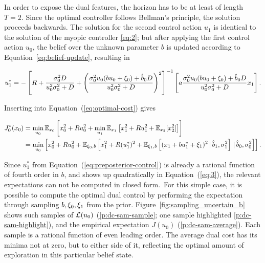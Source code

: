 In order to expose the dual features, the horizon has to be at least of length
$T=2$. Since the optimal controller follows Bellman's principle, the solution
proceeds backwards. The solution for the second control action $u_1$ is
identical to the solution of the myopic controller \eqref{eq:2}; but after
applying the first control action $u_0$, the belief over the unknown parameter
$b$ is updated according to Equation~\eqref{eq:belief-update}, resulting in
\begin{fullwidth}\vspace{-\baselineskip}
\begin{equation}
  \label{eq:preposterior-control}
  u_{1}^* = -\left[\CC +
    \frac{\sigma_0 ^2 \DC}{u_0 ^2\sigma_0 ^2
      +  \DC} + \left(\frac{\sigma_0 ^2 u_0 (b u_0 + \dist_0) + \hat b_0
        \DC}{u_0 ^2 \sigma_0 ^2 + \DC}\right)^2\right]^{-1}
    \left[a \frac{\sigma_0 ^2 u_0 (b u_0 +
      \dist_0) + \hat b_0 \DC}{u_0 ^2 \sigma_0 ^2 + \DC} x_{1}\right].
\end{equation}
\end{fullwidth}

Inserting into Equation~(\ref{eq:optimal-cost}) gives
\begin{fullwidth}\vspace{-\baselineskip}
\begin{equation}
  \label{eq:3}
  \begin{split}
    J_0^*(x_0) &= \min_{u_0} \Exp_{x_0}\left[x_0^2 + \CC
      u_0^2 + \min_{u_1} \Exp_{x_1} \left[ x_1^2 + \CC u_1 ^2
        +\Exp_{x_2}[x_2 ^2]\right]\right] \\
    &= \min_{u_0} \left[ x_0^2 + \CC u_0^2 +
      \Exp_{\dist_0,b} \left[ x_1^2 + \CC (u_1 ^*) ^2
        +\Exp_{\dist_1,b}\left[(x_1+b u_1 ^* + \dist_1)^2\g \hat b_1, \sigma^2_1
    \right] \g \hat b_0, \sigma^2_0\right]\right].
  \end{split}
\end{equation}
\end{fullwidth}
Since $u_1 ^*$ from Equation~(\ref{eq:preposterior-control}) is already a
rational function of fourth order in $b$, and shows up quadratically in
Equation~(\ref{eq:3}), the relevant expectations can not be computed in closed
form.~\cite[\ts III.3]{Aoki:1967:Optimization}\iss For this simple case, it
is possible to compute the optimal dual control by performing the expectation
through sampling $b, \xi_0, \xi_1$ from the prior.
Figure~\ref{fig:sampling_uncertain_b} shows such samples of $\mathcal{L}(u_0)$
(\ref*{p:dc-sam-sample}; one sample highlighted \ref*{p:dc-sam-highlight}), and
the empirical expectation $J(u_0)$ (\ref*{p:dc-sam-average}). Each sample
is a rational function of even leading order. The average dual cost has its
minima not at zero, but to either side of it, reflecting the optimal amount of
exploration in this particular belief state.

